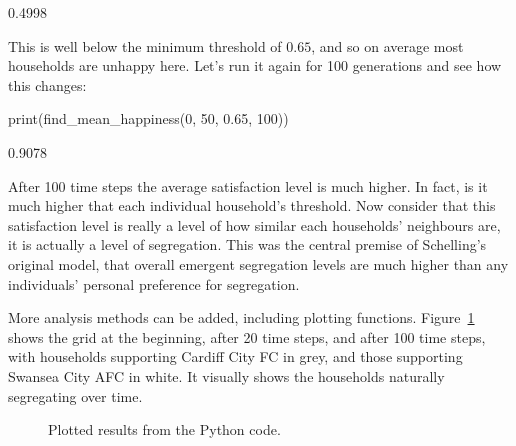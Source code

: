 \begin{pyout}
0.4998
\end{pyout}

This is well below the minimum threshold of $0.65$, and so on average most
households are unhappy here.
Let's run it again for 100 generations and see how this changes:

\begin{pyin}
print(find_mean_happiness(0, 50, 0.65, 100))
\end{pyin}

\begin{pyout}
0.9078
\end{pyout}

After 100 time steps the average satisfaction level is much higher.
In fact, is it much higher that each individual household's threshold.
Now consider that this satisfaction level is really a level of how similar
each households' neighbours are, it is actually a level of segregation.
This was the central premise of Schelling's original model, that overall
emergent segregation levels are much higher than any individuals' personal
preference for segregation.

More analysis methods can be added, including plotting functions.
Figure~\ref{fig:schelling_python_plot} shows the grid at the beginning, after 20
time steps, and after 100 time steps, with households supporting Cardiff City FC
in grey, and those supporting Swansea City AFC in white.
It visually shows the households naturally segregating over time.

\begin{figure}
\begin{center}
\end{center}
\caption{Plotted results from the Python code.}
\label{fig:schelling_python_plot}
\end{figure}

